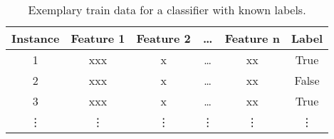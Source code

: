 \begin{table}[h!]
    \small
    \centering
    \begin{tabular}{@{}cccccc@{}}
        \toprule
        \textbf{Instance} & \textbf{Feature 1} & \textbf{Feature 2} & \dots  & \textbf{Feature n} & \textbf{Label} \\
        \midrule
        1                 & xxx                & x                  & \dots  & xx                 & True           \\
        2                 & xxx                & x                  & \dots  & xx                 & False          \\
        3                 & xxx                & x                  & \dots  & xx                 & True           \\
        \vdots            & \vdots             & \vdots             & \vdots & \vdots             & \vdots         \\
        \bottomrule
    \end{tabular}
    \caption[Exemplary train data for a classifier with known labels.]{Exemplary train data for a classifier with known labels. \footnotemark}
    \label{tab:classifier_label_data}
\end{table}
